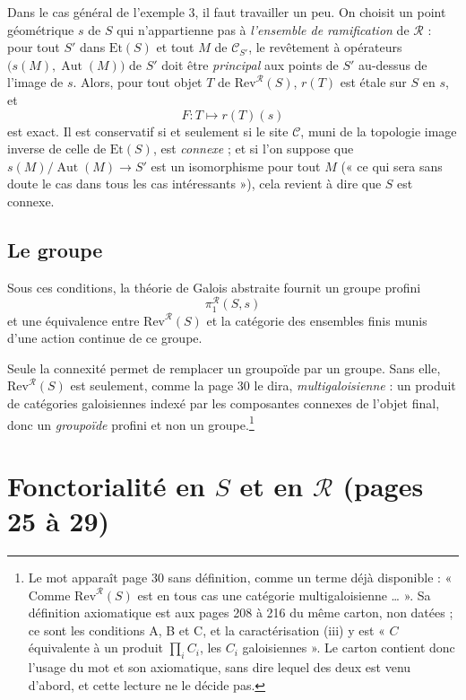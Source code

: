 \documentclass[11pt,a4paper]{article}
\begin{document}
Dans le cas général de l'exemple 3, il faut travailler un peu. On choisit un
point géométrique $s$ de $S$ qui n'appartienne pas à \emph{l'ensemble de
ramification} de $\mathcal{R}$ : pour tout $S'$ dans $\mathrm{Et}(S)$ et tout
$M$ de $\mathcal{C}_{S'}$, le revêtement à opérateurs $\bigl(s(M),
\operatorname{Aut}(M)\bigr)$ de $S'$ doit être \emph{principal} aux points de
$S'$ au-dessus de l'image de $s$. Alors, pour tout objet $T$ de
$\mathrm{Rev}^{\mathcal{R}}(S)$, $r(T)$ est étale sur $S$ en $s$, et
\[
  F : T \longmapsto r(T)(s)
\]
est exact. Il est conservatif si et seulement si le site $\mathcal{C}$, muni de
la topologie image inverse de celle de $\mathrm{Et}(S)$, est \emph{connexe} ;
et si l'on suppose que $s(M)/\!\operatorname{Aut}(M) \to S'$ est un isomorphisme
pour tout $M$ (« ce qui sera sans doute le cas dans tous les cas
intéressants »), cela revient à dire que $S$ est connexe.

\subsection*{Le groupe}

Sous ces conditions, la théorie de Galois abstraite fournit un groupe profini
\[
  \pi_{1}^{\mathcal{R}}(S, s)
\]
et une équivalence entre $\mathrm{Rev}^{\mathcal{R}}(S)$ et la catégorie des
ensembles finis munis d'une action continue de ce groupe.

Seule la connexité permet de remplacer un groupoïde par un groupe. Sans elle,
$\mathrm{Rev}^{\mathcal{R}}(S)$ est seulement, comme la
page 30 le dira, \emph{multigaloisienne} : un produit de catégories
galoisiennes indexé par les composantes connexes de l'objet final, donc un
\emph{groupoïde} profini et non un groupe.\footnote{Le mot apparaît page 30
sans définition, comme un terme déjà disponible : « Comme
$\mathrm{Rev}^{\mathcal{R}}(S)$ est en tous cas une catégorie
multigaloisienne … ». Sa définition axiomatique est aux pages 208 à 216 du
même carton, non datées ; ce sont les conditions A, B et C, et la
caractérisation (iii) y est « $C$ équivalente à un produit
$\prod_{i} C_{i}$, les $C_{i}$ galoisiennes ». Le carton contient donc l'usage
du mot et son axiomatique, sans dire lequel des deux est venu d'abord, et cette
lecture ne le décide pas.}

\section*{Fonctorialité en $S$ et en $\mathcal{R}$ (pages 25 à 29)}
\end{document}
